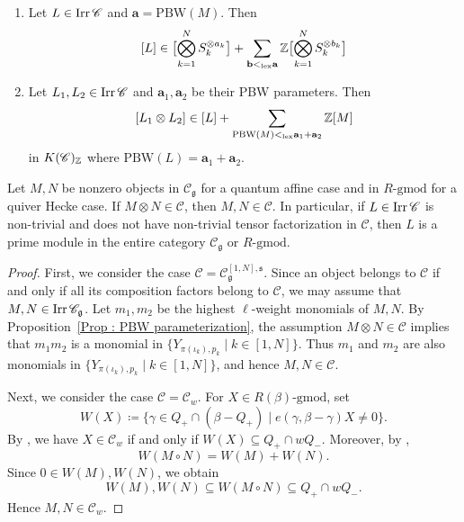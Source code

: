 \begin{Lem}\label{Lem : tensor PBW}
\begin{enumerate}
  \item Let $L \in \mathop{\mathrm{Irr}}\nolimits \mathscr{C}$ and $\mathbf{a} = \mathrm{PBW}(M)$. 
  Then 
  \[
  [L] \in  \bigl[\bigotimes_{k=1}^N S_k^{\otimes a_k}\bigr] 
  + \sum_{\mathbf{b}<_{\mathrm{lex}}\mathbf{a}}\mathbb{Z} \bigl[\bigotimes_{k=1}^N S_k^{\otimes b_k}\bigr]
  \]
  \item Let $L_1, L_2 \in \mathop{\mathrm{Irr}}\nolimits \mathscr{C}$ and $\mathbf{a}_1, \mathbf{a}_2$ be their PBW parameters. 
  Then 
  \[
  [L_1\otimes L_2] \in [L]+ \sum_{\mathrm{PBW}(M)<_{\mathrm{lex}}\mathbf{a}_1+\mathbf{a}_2}  \mathbb{Z} [M]
  \]
  in $K(\mathscr{C})_{\mathbb{Z}}$ where $\mathrm{PBW}(L) = \mathbf{a}_1 + \mathbf{a}_2$. 
\end{enumerate}
\end{Lem}

\begin{Prop}
\label{Prop : tensor factors in category}
Let $M,N$ be nonzero objects in $\mathscr{C}_{\mathfrak{g}}$ for a quantum affine case and 
in $R\text{-gmod}$ for a quiver Hecke case. 
If $M\otimes N\in\mathscr{C}$, then $M,N\in\mathscr{C}$. 
In particular, if $L \in \mathop{\mathrm{Irr}}\nolimits\mathscr{C}$ is non-trivial and does not have non-trivial tensor factorization 
in $\mathscr{C}$, then $L$ is a prime module in the entire category 
$\mathscr{C}_{\mathfrak{g}}$ or $R\text{-gmod}$. 
\end{Prop}

\begin{proof}
First, we consider the case
$\mathscr{C}=\mathscr{C}_{\mathfrak{g}}^{[1, N], \mathfrak{s}}$.
Since an object belongs to $\mathscr{C}$ if and only if all its
composition factors belong to $\mathscr{C}$, we may assume that
$M,N\in\mathop{\mathrm{Irr}}\nolimits \mathscr{C}_{\mathfrak{g}}$.
Let $m_1,m_2$ be the highest $\ell$-weight monomials of $M,N$. 
By Proposition~\ref{Prop : PBW parameterization}, the assumption
$M\otimes N\in\mathscr{C}$ implies that $m_1m_2$ is a monomial in
$\{Y_{\pi(\iota_k),p_k}\mid k\in[1,N]\}$.
Thus $m_1$ and $m_2$ are also monomials in
$\{Y_{\pi(\iota_k),p_k}\mid k\in[1,N]\}$, and hence $M,N\in\mathscr{C}$.

Next, we consider the case $\mathscr{C}=\mathscr{C}_w$.
For $X\in R(\beta)\text{-gmod}$, set
\[
W(X)\coloneq
\{\gamma\in Q_+\cap(\beta-Q_+)\mid e(\gamma,\beta-\gamma)X\neq0\}.
\]
By \cite[(2.5)]{strata}, we have $X\in\mathscr{C}_w$ if and only if
$W(X)\subseteq Q_+\cap wQ_-$.
Moreover, by \cite[Lemma~2.2]{strata},
\[
W(M\circ N)=W(M)+W(N).
\]
Since $0\in W(M),W(N)$, we obtain
\[
W(M),W(N)\subseteq W(M\circ N)\subseteq Q_+\cap wQ_-.
\]
Hence $M,N\in\mathscr{C}_w$.
\end{proof}
